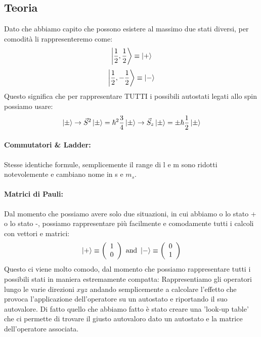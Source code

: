 \subsection{Teoria}

Dato che abbiamo capito che possono esistere al massimo due stati diversi, per comodità li rappresenteremo come:
$$\left| \frac{1}{2}, \frac{1}{2} \right> \equiv \ket{+}$$
$$\left| \frac{1}{2}, -\frac{1}{2} \right> \equiv \ket{-}$$
Questo significa che per rappresentare TUTTI i possibili autostati legati allo spin possiamo usare:
$$\ket{\pm} \rightarrow \vec{S}^2 \ket{\pm} = \hbar^2\frac{3}{4}\ket{\pm} \rightarrow \vec{S}_z \ket{\pm} = \pm \hbar \frac{1}{2} \ket{\pm}$$

\paragraph{Commutatori \& Ladder:}
Stesse identiche formule, semplicemente il range di l e m sono ridotti notevolemente e cambiano nome in s e $m_s$.

\paragraph{Matrici di Pauli:}
Dal momento che possiamo avere solo due situazioni, in cui abbiamo o lo stato + o lo stato -, possiamo rappresentare più facilmente e comodamente tutti i calcoli con vettori e matrici:
$$\ket{+} \equiv \left(\begin{array}{c}
	1 \\
	0 \\
\end{array}\right) \text{ and }
\ket{-} \equiv \left(\begin{array}{c}
	0 \\
	1 \\
\end{array}\right)$$
Questo ci viene molto comodo, dal momento che possiamo rappresentare tutti i possibili stati in maniera estremamente compatta: Rappresentiamo gli operatori lungo le varie direzioni $xyz$ andando semplicemente a calcolare l'effetto che provoca l'applicazione dell'operatore su un autostato e riportando il suo autovalore. Di fatto quello che abbiamo fatto è stato creare una 'look-up table' che ci permette di trovare il giusto autovaloro dato un autostato e la matrice dell'operatore associata.

